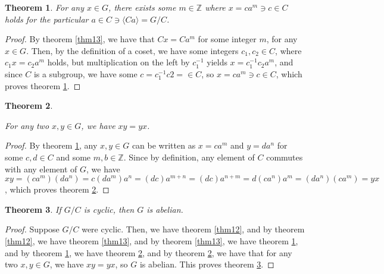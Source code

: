 \documentclass[12pt]{article}
\newcommand{\ints}{\mathbb{Z}}
\newtheorem{thm}{Theorem}
\begin{document}
\begin{thm} \label{thm14}
	For any $x \in G$, there exists some $m \in \ints$ where $x = ca^m \ni c \in C$ holds
	for the particular $a \in C \ni \langle Ca \rangle = G/C$.
\end{thm}

\begin{proof}
	By theorem \ref{thm13},
	we have that $Cx = Ca^m$
	for some integer $m$,
	for any $x \in G$.
	Then, by the definition of a coset,
	we have some integers $c_1,c_2 \in C$,
	where $c_1x = c_2a^m$ holds,
	but multiplication on the left by $c_1^{-1}$
	yields $x = c_1^{-1}c_2a^m$,
	and since $C$ is a subgroup,
	we have some $c = c_1^{-1}c2 = \in C$,
	so $x = ca^m \ni c \in C$,
	which proves theorem \ref{thm14}.
\end{proof}

\begin{thm} \label{thm15}

	For any two $x,y \in G$, we have $xy = yx$.
\end{thm}

\begin{proof}
	By theorem \ref{thm14},
	any $x,y \in G$ can be written as
	$x = ca^m$ and $y = da^n$
	for some $c,d \in C$
	and some $m,b \in \ints$.
	Since by definition,
	any element of $C$ commutes
	with any element of $G$,
	we have $xy = (ca^m)(da^n) = c(da^m)a^n = (dc)a^{m + n}
	= (dc)a^{n + m} = d(ca^n)a^m = (da^n)(ca^m) = yx$,
	which proves theorem \ref{thm15}.
\end{proof}

\begin{thm} \label{thm16}
	If $G/C$ is cyclic, then $G$ is abelian.
\end{thm}

\begin{proof}
	Suppose $G/C$ were cyclic.
	Then, we have theorem \ref{thm12},
	and by theorem \ref{thm12},
	we have theorem \ref{thm13},
	and by theorem \ref{thm13},
	we have theorem \ref{thm14},
	and by theorem \ref{thm14},
	we have theorem \ref{thm15},
	and by theorem \ref{thm15},
	we have that for any two
	$x,y \in G$, we have $xy = yx$,
	so $G$ is abelian.
	This proves theorem \ref{thm16}.
\end{proof}
\end{document}
